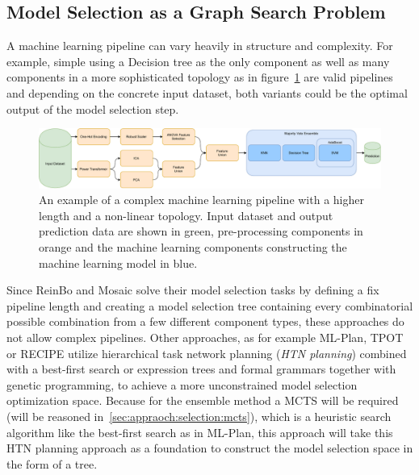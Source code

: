 \subsection{Model Selection as a Graph Search Problem}
\label{sec:appraoch:selection:search}
A machine learning pipeline can vary heavily in structure and complexity.
For example, simple using a Decision tree as the only component as well as many components in a more sophisticated topology as in figure~\ref{fig:appraoch:complex-pipeline} are valid pipelines and depending on the concrete input dataset, both variants could be the optimal output of the model selection step.
\begin{figure}[ht!]
    \centering
    \includegraphics[width=\textwidth]{gfx/Figures/Approach/ComplexPipeline.pdf}
    \caption[An example of a complex machine learning pipeline with a higher length and a non-linear topology.]{An example of a complex machine learning pipeline with a higher length and a non-linear topology. Input dataset and output prediction data are shown in green, pre-processing components in orange and the machine learning components constructing the machine learning model in blue.}
    \label{fig:appraoch:complex-pipeline}
\end{figure}
Since ReinBo and Mosaic solve their model selection tasks by defining a fix pipeline length and creating a model selection tree containing every combinatorial possible combination from a few different component types, these approaches do not allow complex pipelines.\newline
Other approaches, as for example ML-Plan, TPOT or RECIPE utilize hierarchical task network planning (\textit{HTN planning}) combined with a best-first search or expression trees and formal grammars together with genetic programming, to achieve a more unconstrained model selection optimization space.
Because for the ensemble method a MCTS will be required (will be reasoned in~\ref{sec:appraoch:selection:mcts}), which is a heuristic search algorithm like the best-first search as in ML-Plan, this approach will take this HTN planning approach as a foundation to construct the model selection space in the form of a tree.

